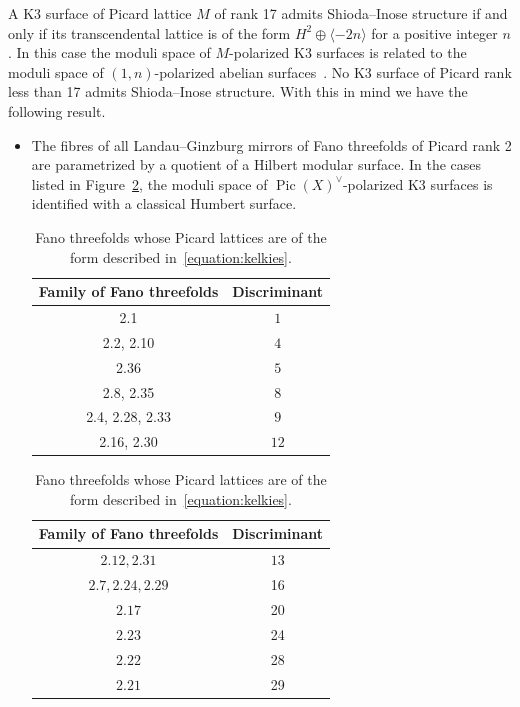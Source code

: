 \documentclass[10pt]{amsart}
\numberwithin{equation}{section}
\theoremstyle{plain}
\theoremstyle{definition}
\theoremstyle{remark}
\DeclareMathOperator{\Pic}{Pic}
\begin{document}
A K3 surface of Picard lattice \(M\) of rank 17 admits Shioda--Inose structure if and only if its transcendental lattice is of the form \(H^2 \oplus \langle -2n \rangle\) for a positive integer \(n\). In this case the moduli space of \(M\)-polarized K3 surfaces is related to the moduli space of \((1,n)\)-polarized abelian surfaces~\cite{gritsenko1998minimal}. No K3 surface of Picard rank less than 17 admits Shioda--Inose structure. With this in mind we have the following result.
\begin{itemize}[\quad -]
\item The fibres of all Landau--Ginzburg mirrors of Fano threefolds of Picard rank 2 are parametrized by a quotient of a Hilbert modular surface. In the cases listed in Figure~\ref{figure:modular2}, the moduli space of \(\Pic(X)^\vee\)-polarized K3 surfaces is identified with a classical Humbert surface.

\begin{table}[H]
  \begin{minipage}[t]{0.45\textwidth}
    \begin{tabular}{|c|c|}
      \hline
      Family of Fano threefolds & Discriminant \\
      \hline
      \hline
      2.1 & \(1\) \\
      \hline
      2.2, 2.10 & \(4\) \\
      \hline
      2.36 & \(5\) \\
      \hline
      2.8, 2.35 & \(8\) \\
      \hline
      2.4, 2.28, 2.33 & \(9\) \\
      \hline
      2.16, 2.30  & \(12\) \\
      \hline
    \end{tabular}
  \end{minipage}%
  \begin{minipage}[t]{0.45\textwidth}
    \begin{tabular}{|c|c|}
      \hline
      Family of Fano threefolds & Discriminant \\
      \hline
      \hline
      \(2.12, 2.31\) & \(13\) \\
      \hline
      \(2.7, 2.24, 2.29\) & 16 \\
      \hline
      \(2.17\) & 20 \\
      \hline
      \(2.23\) & 24 \\
      \hline
      \(2.22\) & 28 \\
      \hline
      \(2.21\) & 29 \\
      \hline
    \end{tabular}
  \end{minipage}
  \caption{Fano threefolds whose Picard lattices are of the form described in~\eqref{equation:kelkies}.}\label{figure:modular2}
\end{table}


\end{itemize}
\end{document}
